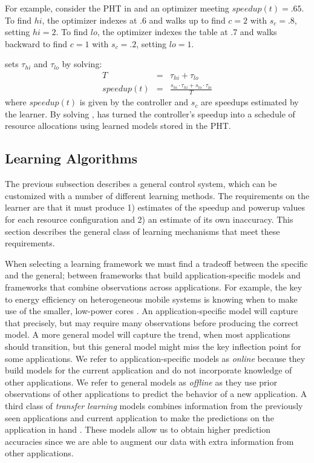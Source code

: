 For example, consider the PHT in  and an optimizer
meeting $speedup(t) = .65$.  To find $hi$, the optimizer indexes at .6
and walks up to find $c=2$ with $s_c=.8$, setting $hi = 2$.  To find
$lo$, the optimizer indexes the table at .7 and walks backward to find
$c=1$ with $s_c=.2$, setting $lo = 1$.

\SYSTEM{} sets $\tau_{hi}$ and $\tau_{lo}$ by solving:
\begin{eqnarray}
  T &=& \tau_{hi} + \tau_{lo}    \label{eqn:s1} \\
  speedup(t) &=& \frac{s_{hi} \cdot \tau_{hi} + s_{lo} \cdot \tau_{lo}}{T} \label{eqn:s2}
\end{eqnarray}
where $speedup(t)$ is given by the controller and $s_c$ are speedups
estimated by the learner.  By solving , \SYSTEM{} has
turned the controller's speedup into a schedule of resource
allocations using learned models stored in the PHT.

\subsection{\SYSTEM{} Learning Algorithms}
The previous subsection describes a general control system, which can
be customized with a number of different learning methods.  The
requirements on the learner are that it must produce 1) estimates of
the speedup and powerup values for each resource configuration and 2)
an estimate of its own inaccuracy.
This section describes the general class of learning mechanisms that
meet these requirements.

When selecting a learning framework we must find a tradeoff between
the specific and the general; \ie between frameworks that build
application-specific models and frameworks that combine observations
across applications.  For example, the key to energy efficiency on
heterogeneous mobile systems is knowing when to make use of the
smaller, low-power cores \cite{kim-cpsna,Carroll2013,LeSueur11}.  An
application-specific model will capture that precisely, but may
require many observations before producing the correct model.  A more
general model will capture the trend, \eg when most applications
should transition, but this general model might miss the key
inflection point for some applications.  We refer to
application-specific models as \emph{online} because they build models
for the current application and do not incorporate knowledge of other
applications.  We refer to general models as \emph{offline} as they
use prior observations of other applications to predict the behavior
of a new application. A third class of \emph{transfer learning} models
combines information from the previously seen applications and current
application to make the predictions on the application in hand
\cite{pan2010survey} . These models allow us to obtain higher
prediction accuracies since we are able to augment our data with extra
information from other applications.

